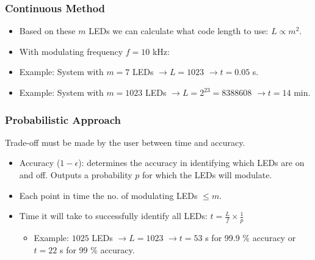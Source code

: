 \documentclass{beamer}
\begin{document}
	\begin{frame}\frametitle{Continuous Method}


		\begin{itemize}
			\item Based on these $m$ LEDs we can calculate what code length to use: $L \propto m^2$.
			\item With modulating frequency $f = 10$ kHz:
			\item Example: System with $m = 7$ LEDs $\rightarrow L = 1023$ $\rightarrow t = 0.05$ s.
			\item Example: System with $m = 1023$ LEDs $\rightarrow L = 2^{23} = 8388608$ $\rightarrow t = 14$ min.
		\end{itemize}


	\end{frame}



	\begin{frame}\frametitle{Probabilistic Approach}

		Trade-off must be made by the user between time and accuracy.

		\begin{itemize}

			\item Accuracy ($1 - \epsilon$): determines the accuracy in identifying which LEDs are on and off. Outputs a probability $p$ for which the LEDs will modulate.

			\item Each point in time the no. of modulating LEDs $\le m$.

			\item Time it will take to successfully identify all LEDs: $t = \frac{L}{f} \times \frac{1}{p}$

			\begin{itemize}
				\item Example: $1025$ LEDs $\rightarrow L = 1023$ $\rightarrow t = 53$ s for 99.9 \% accuracy or $t = 22$ s for 99 \% accuracy.
			\end{itemize}

		\end{itemize}
		
	\end{frame}
\end{document}

